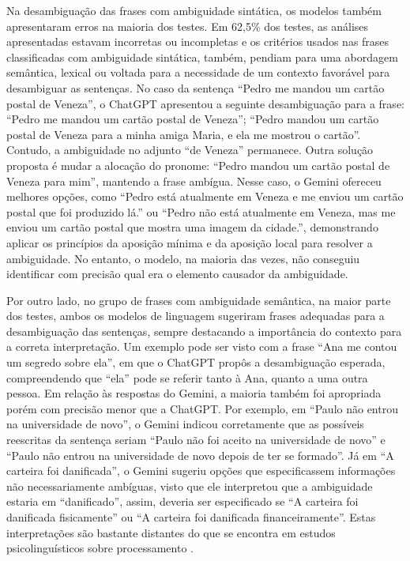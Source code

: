 Na desambiguação das frases com ambiguidade sintática, os modelos também apresentaram erros na maioria dos testes. Em 62,5\% dos testes, as análises apresentadas estavam incorretas ou incompletas e os critérios usados nas frases classificadas com ambiguidade sintática, também, pendiam para uma abordagem semântica, lexical ou voltada para a necessidade de um contexto favorável para desambiguar as sentenças. No caso da sentença \enquote{Pedro me mandou um cartão postal de Veneza}, o ChatGPT apresentou a seguinte desambiguação para a frase: \enquote{Pedro me mandou um cartão postal de Veneza}; \enquote{Pedro mandou um cartão postal de Veneza para a minha amiga Maria, e ela me mostrou o cartão}. Contudo, a ambiguidade no adjunto \enquote{de Veneza} permanece. Outra solução proposta é mudar a alocação do pronome: \enquote{Pedro mandou um cartão postal de Veneza para mim}, mantendo a frase ambígua. Nesse caso, o Gemini ofereceu melhores opções, como \enquote{Pedro está atualmente em Veneza e me enviou um cartão postal que foi produzido lá.} ou \enquote{Pedro não está atualmente em Veneza, mas me enviou um cartão postal que mostra uma imagem da cidade.},  demonstrando aplicar os princípios da aposição mínima e da aposição local \cite{maiadimensoes} para resolver a ambiguidade. No entanto, o modelo, na maioria das vezes, não conseguiu identificar com precisão qual era o elemento causador da ambiguidade.

Por outro lado, no grupo de frases com ambiguidade semântica, na maior parte dos testes, ambos os modelos de linguagem sugeriram frases adequadas para a desambiguação das sentenças, sempre destacando a importância do contexto para a correta interpretação. Um exemplo pode ser visto com a frase \enquote{Ana me contou um segredo sobre ela}, em que o ChatGPT propôs a desambiguação esperada, compreendendo que \enquote{ela} pode se referir tanto à Ana, quanto a uma outra pessoa. Em relação às respostas do Gemini, a maioria também foi apropriada porém com precisão menor que a ChatGPT. Por exemplo, em \enquote{Paulo não entrou na universidade de novo}, o Gemini indicou corretamente que as possíveis reescritas da sentença seriam \enquote{Paulo não foi aceito na universidade de novo} e \enquote{Paulo não entrou na universidade de novo depois de ter se formado}. Já em \enquote{A carteira foi danificada}, o Gemini sugeriu opções que especificassem informações não necessariamente ambíguas, visto que ele interpretou que a ambiguidade estaria em \enquote{danificado}, assim, deveria ser especificado se \enquote{A carteira foi danificada fisicamente} ou \enquote{A carteira foi danificada financeiramente}. Estas interpretações são bastante distantes do que se encontra em estudos psicolinguísticos sobre processamento \cite{machado1996sintaxe, brito2013processamento}.

